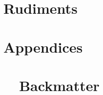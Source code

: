 \documentclass[10pt]{newsiambook}
\begin{document}
\frontmatter
%
\tableofcontents
%
\listoffigures
\listoftables
%
%
%

\mainmatter
\part{Rudiments}



%
\part{Appendices}
\appendix



\part{\ \ Backmatter}
\backmatter
%
%
%
%



\printindex
\end{document}
